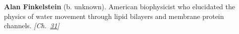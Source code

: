 \textbf{Alan Finkelstein} (b. unknown). American biophysicist who elucidated the physics of water movement through lipid bilayers and membrane protein channels. \emph{[Ch.~\hyperref[ch:osmosisdebye]{31}]}

